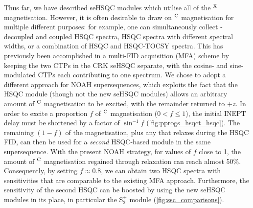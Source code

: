 \documentclass[11pt]{article}
\newcommand*{\noahSpb}{S$^+_2$}
\newcommand*{\carbon}{\ce{^{13}C}}
\newcommand*{\magn}[1]{\ce{^1H}$^{#1}$}
\begin{document}
\begin{refsection}
Thus far, we have described seHSQC modules which utilise all of the \magn{\ce{X}} magnetisation.
However, it is often desirable to draw on \magn{\ce{C}} magnetisation for multiple different purposes: for example, one can simultaneously collect \carbon{}-decoupled and coupled HSQC spectra,\autocite{Nolis2019CPC} HSQC spectra with different spectral widths,\autocite{Nolis2019JMR} or a combination of HSQC and HSQC-TOCSY spectra.\autocite{Nolis2019CPC}
This has previously been accomplished in a multi-FID acquisition (MFA) scheme by keeping the two CTPs in the CRK seHSQC separate, with the cosine- and sine-modulated CTPs each contributing to one spectrum.\autocite{ctphsqc}
We chose to adopt a different approach for NOAH supersequences, which exploits the fact that the HSQC module (though not the new seHSQC modules) allows an arbitrary amount of \magn{\ce{C}} magnetisation to be excited, with the remainder returned to $+z$.\autocite{Kupce2007MRC, SchulzeSunninghausen2014JACS, SchulzeSunninghausen2017JMR, Koos2019JMR}
In order to excite a proportion $f$ of \magn{\ce{C}} magnetisation ($0 < f \leq 1$), the initial INEPT delay must be shortened by a factor of $\sin^{-1}f$ (\cref{fig:pprogs_hsqct_hsqc}).
The remaining $(1 - f)$ of the magnetisation, plus any that relaxes during the HSQC FID, can then be used for a \textit{second} HSQC-based module in the same supersequence.
With the present NOAH strategy, for values of $f$ close to 1, the amount of \magn{\ce{C}} magnetisation regained through relaxation can reach almost 50\%.
Consequently, by setting $f \approx 0.8$, we can obtain two HSQC spectra with sensitivities that are comparable to the existing MFA approach.
Furthermore, the sensitivity of the second HSQC can be boosted by using the new seHSQC modules in its place, in particular the \noahSpb{} module (\cref{fig:ssc_comparisons}).


\end{refsection}
\end{document}
